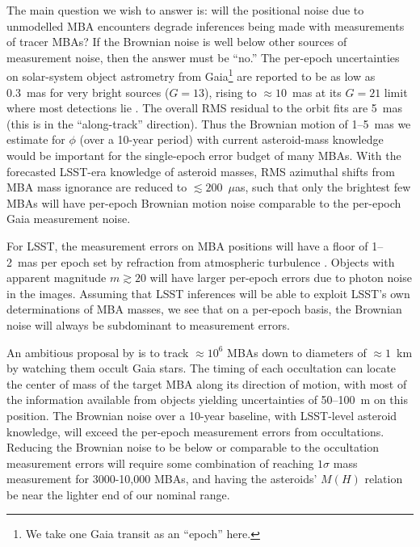 \documentclass[linenumbers, onecolumn]{aastex631}
\newcommand\edited[1]{{\color{red} {#1}}}
\newcommand{\uas}{$\mu$as}
\begin{document}
\edited{The main question we wish to answer is:} will the positional noise due to unmodelled
MBA encounters degrade inferences being made with measurements of
tracer MBAs?  If the Brownian noise is well below other sources of measurement noise, then the answer must be ``no.''
The per-epoch uncertainties on solar-system object astrometry from
Gaia\footnote{We take one Gaia transit as an ``epoch'' here.} are reported to be
as low as 0.3~mas for very bright sources ($G=13$), rising to $\approx10$~mas at
its $G=21$ limit where most detections lie \citep[][Figure 6]{gaiass3}.  The
overall RMS residual to the orbit fits are 5~mas (this is in the ``along-track''
direction).  Thus the Brownian motion of \edited{1--5~mas we estimate for $\phi$
  (over a 10-year period) with current asteroid-mass knowledge would be
  important for the single-epoch error budget of many MBAs.}  With the
forecasted LSST-era knowledge of asteroid masses, \edited{RMS azimuthal shifts
  from MBA mass ignorance are reduced to $\lesssim 200$~\uas, such that only the
  brightest few MBAs will have per-epoch Brownian motion noise comparable to the
  per-epoch Gaia measurement noise.}

For LSST, the measurement errors on MBA positions will have a floor of 1--2~mas per epoch set by refraction from atmospheric turbulence \citep{willow,trojans}.  Objects with apparent magnitude $m\gtrsim20$ will have larger per-epoch errors due to photon noise in the images.  Assuming that LSST inferences will be able to exploit LSST's own determinations of MBA masses, we see that on a per-epoch basis, the Brownian noise will always be subdominant to measurement errors.

An ambitious proposal by \citet{occultations} is to track $\approx10^6$ MBAs down to diameters of $\approx1$~km by watching them occult Gaia stars.  The timing of each occultation can locate the center of mass of the target MBA along its direction of motion, with most of the information available from objects yielding uncertainties of 50--100~m on this position.  The Brownian noise over a 10-year baseline, with LSST-level asteroid knowledge, will \edited{exceed the per-epoch measurement errors from occultations.  Reducing the Brownian noise to be below or comparable to the occultation measurement errors will require some combination of reaching $1\sigma$ mass measurement for 3000-10,000 MBAs, and having the asteroids' $M(H)$ relation be near the lighter end of our nominal range.}
\end{document}
